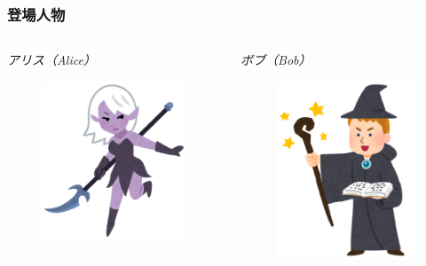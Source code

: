 \begin{frame}
  \frametitle{登場人物}

  \begin{columns}
    \begin{column}{0.48\textwidth}
      \emph{アリス（Alice）}

      \begin{figure}[h]
        \includegraphics[height=0.5\textheight]{img/alice.png}
      \end{figure}
    \end{column}
   
    \begin{column}{0.48\textwidth}
      \emph{ボブ（Bob）}

      \begin{figure}[h]
        \includegraphics[height=0.5\textheight]{img/bob.png}
      \end{figure}
    \end{column}
  \end{columns}


\end{frame}
